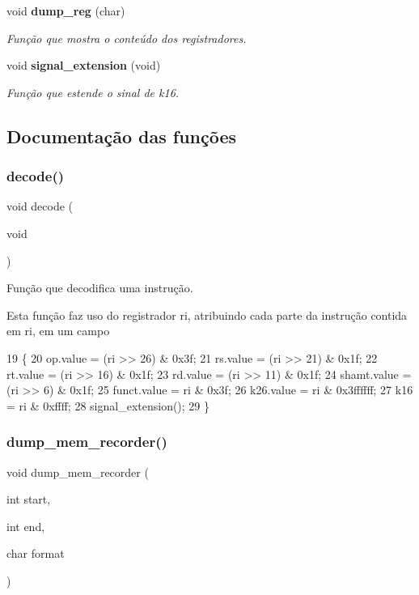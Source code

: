 \begin{DoxyCompactItemize}
void \textbf{ dump\+\_\+reg} (char)
\begin{DoxyCompactList}\small\item\em Função que mostra o conteúdo dos registradores. \end{DoxyCompactList}\item 
void \textbf{ signal\+\_\+extension} (void)
\begin{DoxyCompactList}\small\item\em Função que estende o sinal de k16. \end{DoxyCompactList}\end{DoxyCompactItemize}


\subsection{Documentação das funções}
\mbox{\label{recorder_8h_a34bfe429bf645af9afd5bc1554f5c589}} 
\subsubsection{decode()}
{\footnotesize\ttfamily void decode (\begin{DoxyParamCaption}\item[{void}]{ }\end{DoxyParamCaption})}



Função que decodifica uma instrução. 

Esta função faz uso do registrador ri, atribuindo cada parte da instrução contida em ri, em um campo 
\begin{DoxyCode}
19 \{
20     op.value = (ri >> 26) & 0x3f;
21     rs.value = (ri >> 21) & 0x1f;
22     rt.value = (ri >> 16) & 0x1f;
23     rd.value = (ri >> 11) & 0x1f;
24     shamt.value = (ri >> 6) & 0x1f;
25     funct.value = ri & 0x3f;
26     k26.value = ri & 0x3ffffff;
27     k16 = ri & 0xffff;
28     signal_extension();
29 \}
\end{DoxyCode}
\mbox{\label{recorder_8h_a35a4060a0a098de53a6f1984921892a1}} 
\subsubsection{dump\+\_\+mem\+\_\+recorder()}
{\footnotesize\ttfamily void dump\+\_\+mem\+\_\+recorder (\begin{DoxyParamCaption}\item[{int}]{start,  }\item[{int}]{end,  }\item[{char}]{format }\end{DoxyParamCaption})}




